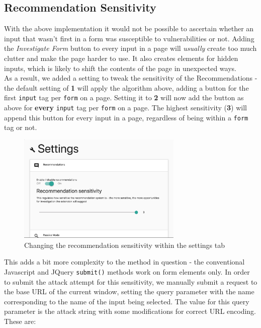 \subsection{Recommendation Sensitivity}

With the above implementation it would not be possible to ascertain whether an input that wasn't first in a form was susceptible to vulnerabilities or not. Adding the \textit{Investigate Form} button to every input in a page will \textit{usually} create too much clutter and make the page harder to use. It also creates elements for hidden inputs, which is likely to shift the contents of the page in unexpected ways. \\

As a result, we added a setting to tweak the sensitivity of the Recommendations - the default setting of \textbf{1} will apply the algorithm above, adding a button for the first \texttt{input} tag per \texttt{form} on a page. Setting it to \textbf{2} will now add the button as above for \textbf{every} \texttt{input} tag per \texttt{form} on a page. The highest sensitivity (\textbf{3}) will append this button for every input in a page, regardless of being within a \texttt{form} tag or not. \\

\begin{figure}[h]
	\centering
	\includegraphics[width=0.7\textwidth]{images/tweaking_recommender_sensitivity.png}
	\caption{Changing the recommendation sensitivity within the settings tab}
	\label{fig:tweaking_recommender_sensitivity}
\end{figure}

This adds a bit more complexity to the method in question - the conventional Javascript and JQuery \texttt{submit()} methods work on form elements only. In order to submit the attack attempt for this sensitivity, we manually submit a request to the base URL of the current window, setting the query parameter with the name corresponding to the name of the input being selected. The value for this query parameter is the attack string with some modifications for correct URL encoding. These are:

